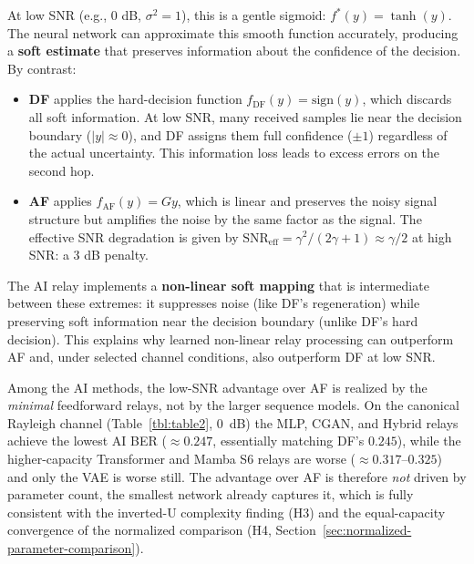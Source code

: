 At low SNR (e.g., 0 dB, \(\sigma^2 = 1\)), this is a gentle sigmoid: \(f^*(y) = \tanh(y)\). The neural network can approximate this smooth function accurately, producing a \textbf{soft estimate} that preserves information about the confidence of the decision. By contrast:

\begin{itemize}
\item
  \textbf{DF} applies the hard-decision function \(f_{\text{DF}}(y) = \text{sign}(y)\), which discards all soft information. At low SNR, many received samples lie near the decision boundary (\(|y| \approx 0\)), and DF assigns them full confidence (\(\pm 1\)) regardless of the actual uncertainty. This information loss leads to excess errors on the second hop.
\item
  \textbf{AF} applies \(f_{\text{AF}}(y) = Gy\), which is linear and preserves the noisy signal structure but amplifies the noise by the same factor as the signal. The effective SNR degradation is given by \(\text{SNR}_{\text{eff}} = \gamma^2 / (2\gamma + 1) \approx \gamma/2\) at high SNR: a 3 dB penalty.
\end{itemize}

The AI relay implements a \textbf{non-linear soft mapping} that is intermediate between these extremes: it suppresses noise (like DF's regeneration) while preserving soft information near the decision boundary (unlike DF's hard decision). This explains why learned non-linear relay processing can outperform AF and, under selected channel conditions, also outperform DF at low SNR.

Among the AI methods, the low-SNR advantage over AF is realized by the \emph{minimal} feedforward relays, not by the larger sequence models. On the canonical Rayleigh channel (Table~\ref{tbl:table2}, 0~dB) the MLP, CGAN, and Hybrid relays achieve the lowest AI BER ($\approx 0.247$, essentially matching DF's $0.245$), while the higher-capacity Transformer and Mamba S6 relays are worse ($\approx 0.317$--$0.325$) and only the VAE is worse still. The advantage over AF is therefore \emph{not} driven by parameter count, the smallest network already captures it, which is fully consistent with the inverted-U complexity finding (H3) and the equal-capacity convergence of the normalized comparison (H4, Section~\ref{sec:normalized-parameter-comparison}).

